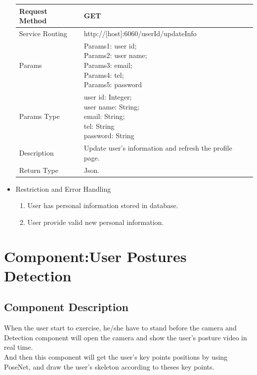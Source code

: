 \documentclass[16pt]{scrreprt}
\begin{document}
\begin{itemize}
\begin{center}
    \begin{tabular}{p{5cm}p{10cm}}
        \hline
	    Request Method & GET\\
        \hline
	    Service Routing &  http://[host]:6060/{userId}/updateInfo\\
        \hline
	    Params & \makecell[l]{Params1: user id;\\Params2: user name;\\Params3: email;\\Params4: tel;\\Params5: password}\\ 
        \hline
        Params Type & \makecell[l]{user id: Integer;\\user name: String;\\email: String;\\tel: String\\password: String}\\
        \hline
        Description & Update user's information and refresh the profile page.\\
        \hline
        Return Type & Json.\\
        \hline
    \end{tabular}
\end{center}
\item Restriction and Error Handling\\
\begin{enumerate}
	\item User has personal information stored in database.
	\item User provide valid new personal information.
\end{enumerate} 
\end{itemize}

\section{Component:User Postures Detection}
\subsection{Component Description}
When the user start to exercise, he/she have to stand before the camera and Detection component will open the camera and show the user's posture video in real time. \\

\noindent And then this component will get the user's key points positions by using PoseNet, and draw the user's skeleton according to theses key points.\\
\end{document}
